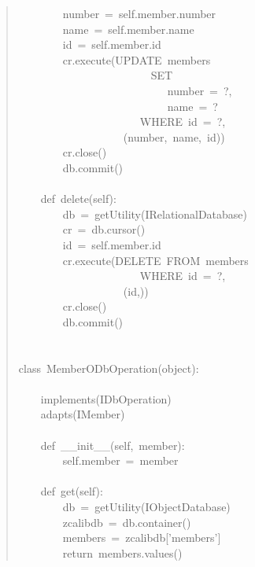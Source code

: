 \documentclass[a4paper,openany,twoside,final]{book}
\begin{document}
\begin{quote}
{~~~~~~~~number~=~self.member.number\\
~~~~~~~~name~=~self.member.name\\
~~~~~~~~id~=~self.member.id\\
~~~~~~~~cr.execute(\textquotedbl{}\textquotedbl{}\textquotedbl{}UPDATE~members\\
~~~~~~~~~~~~~~~~~~~~~~~~SET\\
~~~~~~~~~~~~~~~~~~~~~~~~~~~number~=~?,\\
~~~~~~~~~~~~~~~~~~~~~~~~~~~name~=~?\\
~~~~~~~~~~~~~~~~~~~~~~WHERE~id~=~?\textquotedbl{}\textquotedbl{}\textquotedbl{},\\
~~~~~~~~~~~~~~~~~~~(number,~name,~id))\\
~~~~~~~~cr.close()\\
~~~~~~~~db.commit()\\
~\\
~~~~def~delete(self):\\
~~~~~~~~db~=~getUtility(IRelationalDatabase)\\
~~~~~~~~cr~=~db.cursor()\\
~~~~~~~~id~=~self.member.id\\
~~~~~~~~cr.execute(\textquotedbl{}\textquotedbl{}\textquotedbl{}DELETE~FROM~members\\
~~~~~~~~~~~~~~~~~~~~~~WHERE~id~=~?\textquotedbl{}\textquotedbl{}\textquotedbl{},\\
~~~~~~~~~~~~~~~~~~~(id,))\\
~~~~~~~~cr.close()\\
~~~~~~~~db.commit()\\
~\\
~\\
class~MemberODbOperation(object):\\
~\\
~~~~implements(IDbOperation)\\
~~~~adapts(IMember)\\
~\\
~~~~def~\_\_init\_\_(self,~member):\\
~~~~~~~~self.member~=~member\\
~\\
~~~~def~get(self):\\
~~~~~~~~db~=~getUtility(IObjectDatabase)\\
~~~~~~~~zcalibdb~=~db.container()\\
~~~~~~~~members~=~zcalibdb{[}'members'{]}\\
~~~~~~~~return~members.values()\\
}
\end{quote}
\end{document}
